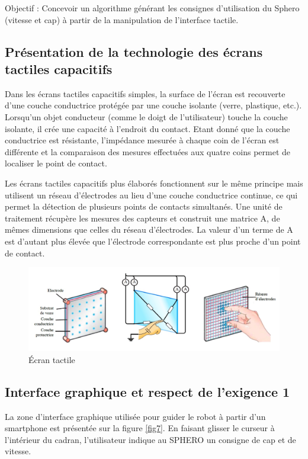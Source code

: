 Objectif : Concevoir un algorithme générant les consignes d'utilisation du Sphero (vitesse et cap) à partir de la manipulation de l'interface tactile. 

\subsection{Présentation de la technologie des écrans tactiles capacitifs}

Dans les écrans tactiles capacitifs simples, la surface de l'écran est recouverte d'une couche conductrice protégée par une couche isolante (verre, plastique, etc.). Lorsqu'un objet conducteur (comme le doigt de l'utilisateur) touche la couche isolante, il crée une capacité à l'endroit du contact. Etant donné que la couche conductrice est résistante, l'impédance mesurée à chaque coin de l'écran est différente et la comparaison des mesures effectuées aux quatre coins permet de localiser le point de contact. 

Les écrans tactiles capacitifs plus élaborés fonctionnent sur le même principe mais utilisent un réseau d'électrodes au lieu d'une couche conductrice continue, ce qui permet la détection de plusieurs points de contacts simultanés. Une unité de traitement récupère les mesures des capteurs et construit une matrice A, de mêmes dimensions que celles du réseau d'électrodes. La valeur d'un terme de A est d'autant plus élevée que l'électrode correspondante est plus proche d'un point de contact. 

\begin{figure}[!ht]\begin{center}
 \includegraphics[width=0.8\linewidth]{img/figure_6}
 \caption{Écran tactile}
 \label{fig6}
\end{center}\end{figure}

\subsection{Interface graphique et respect de l'exigence 1}

La zone d'interface graphique utilisée pour guider le robot à partir d'un smartphone est présentée sur la figure \ref{fig7}. En faisant glisser le curseur à l'intérieur du cadran, l'utilisateur indique au SPHERO un consigne de cap et de vitesse.


